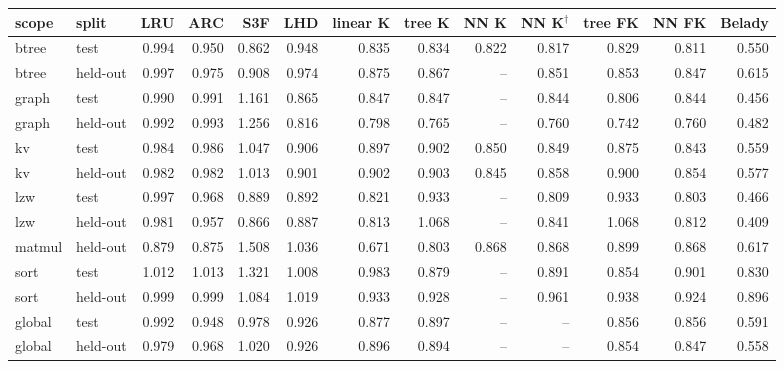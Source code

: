 \begin{tabular}{llrrrrrrrrrrr}
\toprule
scope & split & LRU & ARC & S3F & LHD & linear K & tree K & NN K & NN K$^{\dagger}$ & tree FK & NN FK & Belady \\
\midrule
btree & test & 0.994 & 0.950 & 0.862 & 0.948 & 0.835 & 0.834 & 0.822 & 0.817 & 0.829 & 0.811 & 0.550 \\
btree & held-out & 0.997 & 0.975 & 0.908 & 0.974 & 0.875 & 0.867 & -- & 0.851 & 0.853 & 0.847 & 0.615 \\
graph & test & 0.990 & 0.991 & 1.161 & 0.865 & 0.847 & 0.847 & -- & 0.844 & 0.806 & 0.844 & 0.456 \\
graph & held-out & 0.992 & 0.993 & 1.256 & 0.816 & 0.798 & 0.765 & -- & 0.760 & 0.742 & 0.760 & 0.482 \\
kv & test & 0.984 & 0.986 & 1.047 & 0.906 & 0.897 & 0.902 & 0.850 & 0.849 & 0.875 & 0.843 & 0.559 \\
kv & held-out & 0.982 & 0.982 & 1.013 & 0.901 & 0.902 & 0.903 & 0.845 & 0.858 & 0.900 & 0.854 & 0.577 \\
lzw & test & 0.997 & 0.968 & 0.889 & 0.892 & 0.821 & 0.933 & -- & 0.809 & 0.933 & 0.803 & 0.466 \\
lzw & held-out & 0.981 & 0.957 & 0.866 & 0.887 & 0.813 & 1.068 & -- & 0.841 & 1.068 & 0.812 & 0.409 \\
matmul & held-out & 0.879 & 0.875 & 1.508 & 1.036 & 0.671 & 0.803 & 0.868 & 0.868 & 0.899 & 0.868 & 0.617 \\
sort & test & 1.012 & 1.013 & 1.321 & 1.008 & 0.983 & 0.879 & -- & 0.891 & 0.854 & 0.901 & 0.830 \\
sort & held-out & 0.999 & 0.999 & 1.084 & 1.019 & 0.933 & 0.928 & -- & 0.961 & 0.938 & 0.924 & 0.896 \\
global & test & 0.992 & 0.948 & 0.978 & 0.926 & 0.877 & 0.897 & -- & -- & 0.856 & 0.856 & 0.591 \\
global & held-out & 0.979 & 0.968 & 1.020 & 0.926 & 0.896 & 0.894 & -- & -- & 0.854 & 0.847 & 0.558 \\
\bottomrule
\end{tabular}

